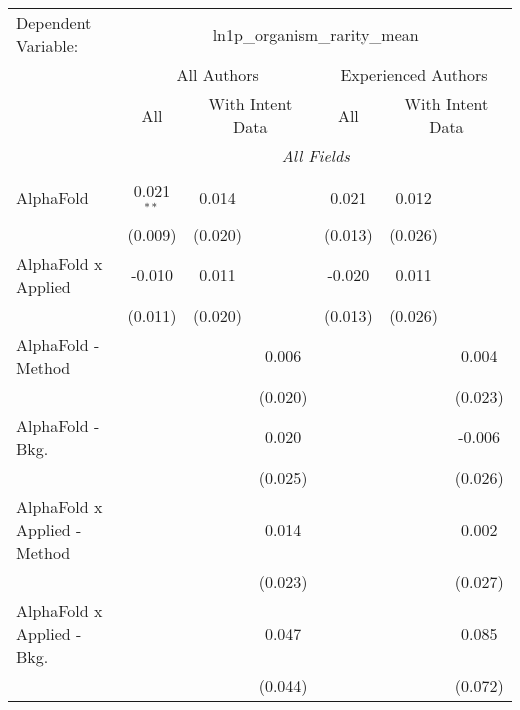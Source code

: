\begingroup
\centering
\begin{tabular}{lcccccc}
   \tabularnewline \midrule \midrule
   Dependent Variable: & \multicolumn{6}{c}{ln1p\_organism\_rarity\_mean}\\
 & \multicolumn{3}{c}{All Authors} & \multicolumn{3}{c}{Experienced Authors} \\
\cmidrule(lr){2-4} \cmidrule(lr){5-7}
 & \multicolumn{1}{c}{All} & \multicolumn{2}{c}{With Intent Data} & \multicolumn{1}{c}{All} & \multicolumn{2}{c}{With Intent Data} \\
\cmidrule(lr){2-2} \cmidrule(lr){3-4} \cmidrule(lr){5-5} \cmidrule(lr){6-7}
 & \multicolumn{6}{c}{\textit{All Fields}} \\ \\
   AlphaFold                      & 0.021$^{**}$ & 0.014         &               & 0.021   & 0.012        &   \\   
                                  & (0.009)      & (0.020)       &               & (0.013) & (0.026)      &   \\   
   AlphaFold x Applied            & -0.010       & 0.011         &               & -0.020  & 0.011        &   \\   
                                  & (0.011)      & (0.020)       &               & (0.013) & (0.026)      &   \\   
   AlphaFold - Method             &              &               & 0.006         &         &              & 0.004\\   
                                  &              &               & (0.020)       &         &              & (0.023)\\   
   AlphaFold - Bkg.               &              &               & 0.020         &         &              & -0.006\\   
                                  &              &               & (0.025)       &         &              & (0.026)\\   
   AlphaFold x Applied - Method   &              &               & 0.014         &         &              & 0.002\\   
                                  &              &               & (0.023)       &         &              & (0.027)\\   
   AlphaFold x Applied - Bkg.     &              &               & 0.047         &         &              & 0.085\\   
                                  &              &               & (0.044)       &         &              & (0.072)\\   

\end{tabular}
